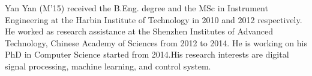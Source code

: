 \documentclass[journal]{IEEEtran}
\begin{document}








% 

\begin{IEEEbiography}{Yan Yan}
(M'15) received the B.Eng. degree and the MSc in Instrument Engineering at the Harbin Institute of Technology in 2010 and 2012 respectively. He worked as research assistance at the Shenzhen Institutes of Advanced Technology, Chinese Academy of Sciences from 2012 to 2014. He is working on his PhD in Computer Science started from 2014.His research interests are digital signal processing, machine learning, and control system.
\end{IEEEbiography}
\end{document}

